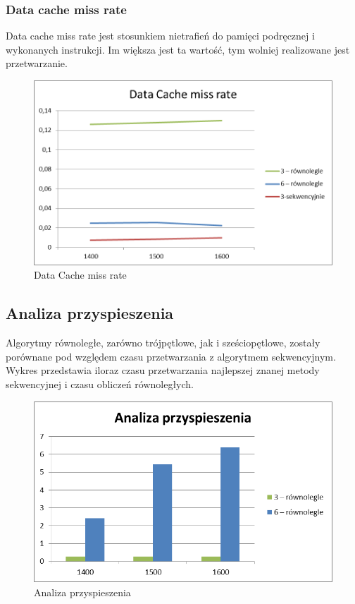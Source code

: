 \documentclass{article}
\begin{document}
\subsubsection{Data cache miss rate}
Data cache miss rate jest stosunkiem nietrafień do pamięci podręcznej i wykonanych instrukcji. Im większa jest ta wartość, tym wolniej realizowane jest przetwarzanie.  

\begin{figure}[H]
	\centering
	\includegraphics[width=\linewidth]{./images/wykresy/miss_rate.png}
	\caption{Data Cache miss rate}
	\label{fig:wykres3}
\end{figure}

\subsection{Analiza przyspieszenia}

Algorytmy równoległe, zarówno trójpętlowe, jak i  sześciopętlowe, zostały porównane pod względem czasu przetwarzania z algorytmem sekwencyjnym. Wykres przedstawia iloraz czasu przetwarzania najlepszej znanej metody sekwencyjnej i czasu obliczeń równoległych.

\begin{figure}[H]
	\centering
	\includegraphics[width=\linewidth]{./images/wykresy/analiza_przyspieszenia.png}
	\caption{Analiza przyspieszenia}
	\label{fig:wykres4}
\end{figure}
\end{document}
